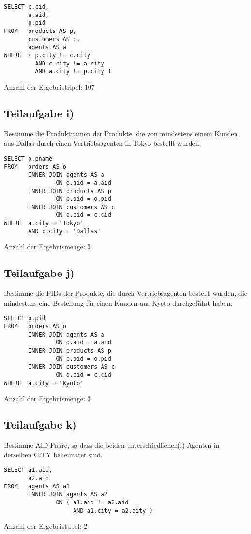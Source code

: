 \begin{lstlisting}
SELECT c.cid, 
       a.aid, 
       p.pid 
FROM   products AS p, 
       customers AS c, 
       agents AS a 
WHERE  ( p.city != c.city 
         AND c.city != a.city 
         AND a.city != p.city )

\end{lstlisting}
Anzahl der Ergebnistripel: 107

\subsection{Teilaufgabe i)}
\label{sec:Teilaufgabe i}
Bestimme die Produktnamen der Produkte, die von mindestens einem Kunden aus Dallas durch einen Vertriebsagenten in Tokyo bestellt wurden.

\begin{lstlisting} 
SELECT p.pname 
FROM   orders AS o 
       INNER JOIN agents AS a 
               ON o.aid = a.aid 
       INNER JOIN products AS p 
               ON p.pid = o.pid 
       INNER JOIN customers AS c 
               ON o.cid = c.cid 
WHERE  a.city = 'Tokyo' 
       AND c.city = 'Dallas'

\end{lstlisting}
Anzahl der Ergebnismenge: 3


\subsection{Teilaufgabe j)}
\label{sec:Teilaufgabe j}
Bestimme die PIDs der Produkte, die durch Vertriebsagenten bestellt wurden, die mindestens eine Bestellung für einen Kunden aus Kyoto durchgeführt haben. 

\begin{lstlisting}
SELECT p.pid 
FROM   orders AS o 
       INNER JOIN agents AS a 
               ON o.aid = a.aid 
       INNER JOIN products AS p 
               ON p.pid = o.pid 
       INNER JOIN customers AS c 
               ON o.cid = c.cid 
WHERE  a.city = 'Kyoto' 
\end{lstlisting}
Anzahl der Ergebnismenge: 3


\subsection{Teilaufgabe k)}
\label{sec:Teilaufgabe k}
Bestimme AID-Paare, so dass die beiden unterschiedlichen(!) Agenten in derselben CITY beheimatet sind.

\begin{lstlisting}
SELECT a1.aid, 
       a2.aid 
FROM   agents AS a1 
       INNER JOIN agents AS a2 
               ON ( a1.aid != a2.aid 
                    AND a1.city = a2.city )  

\end{lstlisting}
Anzahl der Ergebnistupel: 2


